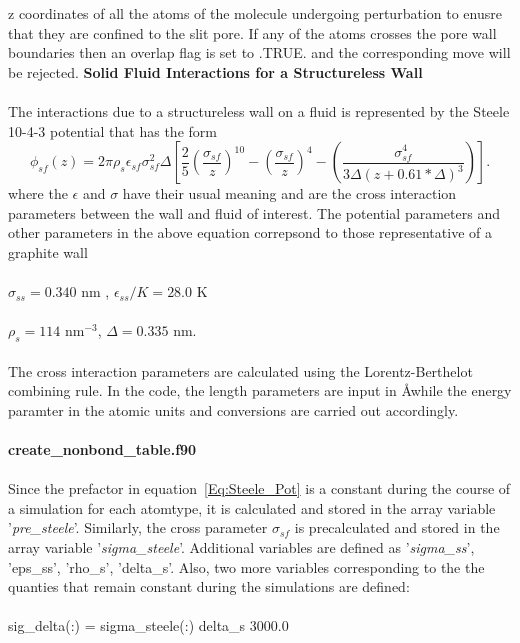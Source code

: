 z coordinates of all the atoms of the molecule undergoing perturbation
to enusre that they are confined to the slit pore. If any of the atoms
crosses the pore wall boundaries then an overlap flag is set to .TRUE.
and the corresponding move will be rejected.
%
{\bf Solid Fluid Interactions for a Structureless Wall} \\ \\
%
The interactions due to a structureless wall on a fluid is 
represented by the Steele 10-4-3 potential that has the form
%
\begin{equation}
\phi_{sf} (z)  =  2 \pi \rho_s \epsilon_{sf} \sigma_{sf}^2 \Delta
 \left [ \frac {2} {5} \left ( \frac {\sigma_{sf}}{z} \right )^{10}
  - \left ( \frac {\sigma_{sf}} {z} \right )^4
  - \left ( \frac {\sigma_{sf}^4} {3\Delta(z+0.61*\Delta)^3} \right ) \right ].
\label{Eq:Steele_Pot}
\end{equation}
where the $\epsilon$ and $\sigma$ have their usual meaning and are the cross
interaction parameters between the wall and fluid of interest. The potential
parameters and other parameters in the above equation correpsond to those
representative of a graphite wall \\ \\
%
$\sigma_{ss} = 0.340$ nm , $\epsilon_{ss}/K = 28.0$ K \\ \\
%
$\rho_s = 114$ nm$^{-3}$, $\Delta = 0.335$ nm. \\ \\
%
The cross interaction parameters are calculated using the Lorentz-Berthelot
combining rule. In the code, the length parameters are input in \AA while
the energy paramter in the atomic units and conversions are carried out 
accordingly. \\ \\
%
{\bf create\_nonbond\_table.f90} \\ \\
%
Since the prefactor in equation~\ref{Eq:Steele_Pot} is a constant during
the course of a simulation for each atomtype, it is calculated and
stored in the array variable '{\em pre\_steele}'. Similarly, the cross
parameter $\sigma_{sf}$ is precalculated and stored in the array 
variable '{\em sigma\_steele}'. Additional variables are defined as
'{\em sigma\_ss}', '{eps\_ss}', '{rho\_s}', 'delta\_s'. Also, two more
variables corresponding to the the quanties that remain constant during
the simulations are defined: \\ \\
%
sig\_delta(:) = sigma\_steele(:) \/ delta\_s \/ 3000.0 \\ \\
